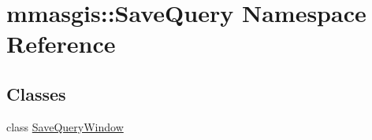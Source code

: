 \hypertarget{namespacemmasgis_1_1SaveQuery}{
\section{mmasgis::SaveQuery Namespace Reference}
\label{namespacemmasgis_1_1SaveQuery}
}
\subsection*{Classes}
\begin{DoxyCompactItemize}
\item 
class \hyperlink{classmmasgis_1_1SaveQuery_1_1SaveQueryWindow}{SaveQueryWindow}
\end{DoxyCompactItemize}

